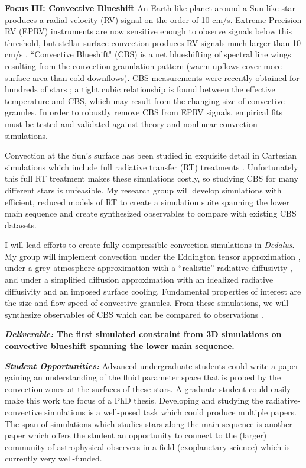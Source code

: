 \documentclass[12pt]{article}
\newcommand{\sct}[1]{\vspace{0.3cm}\hspace{-\parindent}\textbf{\underline{#1}}\hspace{0.3cm}}
\begin{document}
\sct{Focus III: Convective Blueshift}
An Earth-like planet around a Sun-like star produces a radial velocity (RV) signal on the order of 10 cm/s.
Extreme Precision RV (EPRV) instruments are now sensitive enough to observe signals below this threshold, but stellar surface convection produces RV signals much larger than 10 cm/s \citep{crass_etal_2021}.
``Convective Blueshift" (CBS) is a net blueshifting of spectral line wings resulting from the convection granulation pattern (warm upflows cover more surface area than cold downflows).
CBS measurements were recently obtained for hundreds of stars \citep{liebing_etal_2021}; a tight cubic relationship is found between the effective temperature and CBS, which may result from the changing size of convective granules. %
In order to robustly remove CBS from EPRV signals, empirical fits must be tested and validated against theory and nonlinear convection simulations. 

Convection at the Sun's surface has been studied in exquisite detail in Cartesian simulations which include full radiative transfer (RT) treatments \citep[e.g.,][]{rempel2020, danilovic_etal_2022}.
Unfortunately this full RT treatment makes these simulations costly, so studying CBS for many different stars is unfeasible.
My research group will develop simulations with efficient, reduced models of RT to create a simulation suite spanning the lower main sequence and create synthesized observables to compare with existing CBS datasets.

I will lead efforts to create fully compressible convection simulations in \emph{Dedalus}.
My group will implement convection under the Eddington tensor approximation \citep[e.g., ref.][sct.~XI.G]{burns_etal_2020}, under a grey atmosphere approximation with a ``realistic'' radiative diffusivity \citep{barekat_brandenburg_2014}, and under a simplified diffusion approximation with an idealized radiative diffusivity and an imposed surface cooling.
Fundamental properties of interest are the size and flow speed of convective granules.
From these simulations, we will synthesize observables of CBS which can be compared to observations \citep{liebing_etal_2021}.

\textbf{\underline{\emph{Deliverable:}} The first simulated constraint from 3D simulations on convective blueshift spanning the lower main sequence.}

\textbf{\underline{\emph{Student Opportunities:}}} Advanced undergraduate students could write a paper gaining an understanding of the fluid parameter space that is probed by the convection zones at the surfaces of these stars.
A graduate student could easily make this work the focus of a PhD thesis.
Developing and studying the radiative-convective simulations is a well-posed task which could produce multiple papers.
The span of simulations which studies stars along the main sequence is another paper which offers the student an opportunity to connect to the (larger) community of astrophysical observers in a field (exoplanetary science) which is currently very well-funded.
\end{document}
